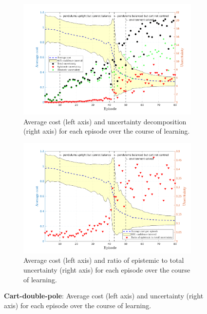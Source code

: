  
\begin{figure}[H]    
  \begin{subfigure}[b]{1\linewidth}
    \centering
    \includegraphics[height=0.4\textheight,width=1\textwidth]{Chapter3/Figures/cdp_uncertainty.png}
    \caption{Average cost (left axis) and uncertainty decomposition (right axis) for each episode over the course of learning.} 
    \label{Fig:Re-cdp-uncertainty} 
  \end{subfigure} 
  \begin{subfigure}[b]{1\linewidth}
    \centering
    \includegraphics[height=0.4\textheight,width=1\textwidth]{Chapter3/Figures/cdp_uncertainty_normalised.png} 
    \caption{Average cost (left axis) and ratio of epistemic to total uncertainty (right axis) for each episode over the course of learning.} 
    \label{Fig:Re-cdp-uncertainty-normalised} 
  \end{subfigure} 
\caption[Uncertainty decomposition for \textbf{cart-double-pole} environment]{\textbf{Cart-double-pole}: Average cost (left axis) and uncertainty (right axis) for each episode over the course of learning.}
\label{Fig:Re-cdp-full-uncertainty} 
\end{figure}

